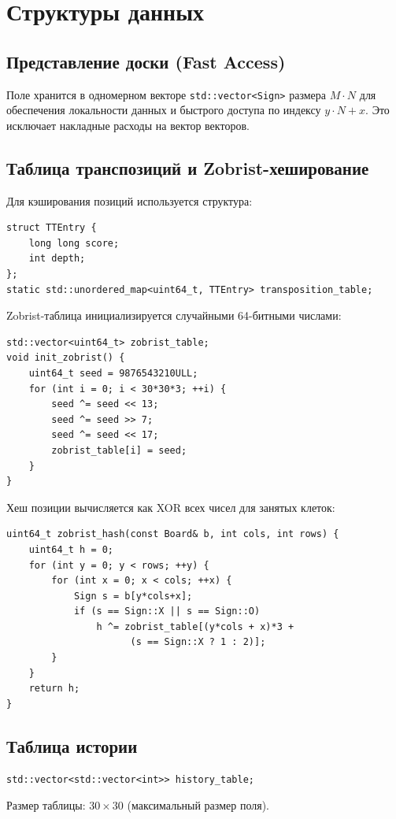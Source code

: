\documentclass[a4paper,14pt]{extreport}
\begin{document}
\section{Структуры данных}
\subsection{Представление доски (Fast Access)}
Поле хранится в одномерном векторе \texttt{std::vector<Sign>} размера $M \cdot N$ для обеспечения локальности данных и быстрого доступа по индексу $y \cdot N + x$. Это исключает накладные расходы на вектор векторов.

\subsection{Таблица транспозиций и Zobrist-хеширование}
Для кэширования позиций используется структура:
\begin{lstlisting}
struct TTEntry { 
    long long score; 
    int depth; 
};
static std::unordered_map<uint64_t, TTEntry> transposition_table;
\end{lstlisting}

Zobrist-таблица инициализируется случайными 64-битными числами:
\begin{lstlisting}
std::vector<uint64_t> zobrist_table;
void init_zobrist() {
    uint64_t seed = 9876543210ULL;
    for (int i = 0; i < 30*30*3; ++i) {
        seed ^= seed << 13; 
        seed ^= seed >> 7; 
        seed ^= seed << 17;
        zobrist_table[i] = seed;
    }
}
\end{lstlisting}

Хеш позиции вычисляется как XOR всех чисел для занятых клеток:
\begin{lstlisting}
uint64_t zobrist_hash(const Board& b, int cols, int rows) {
    uint64_t h = 0;
    for (int y = 0; y < rows; ++y) {
        for (int x = 0; x < cols; ++x) {
            Sign s = b[y*cols+x];
            if (s == Sign::X || s == Sign::O)
                h ^= zobrist_table[(y*cols + x)*3 + 
                      (s == Sign::X ? 1 : 2)];
        }
    }
    return h;
}
\end{lstlisting}

\subsection{Таблица истории}
\begin{lstlisting}
std::vector<std::vector<int>> history_table;
\end{lstlisting}
Размер таблицы: $30 \times 30$ (максимальный размер поля).
\end{document}
